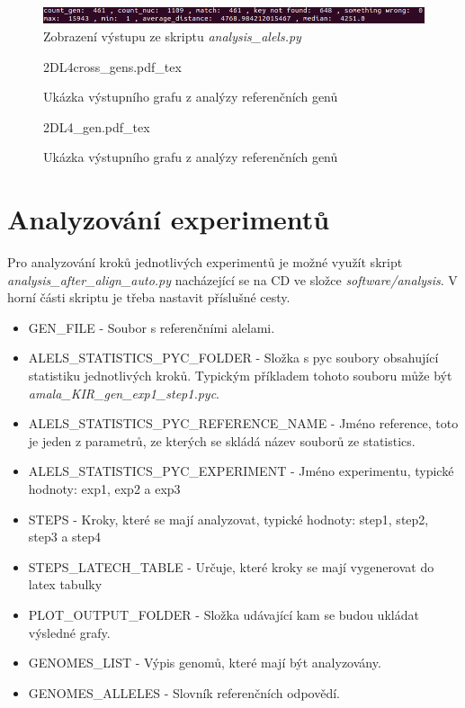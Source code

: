 \documentclass[czech,DP]{thesiskiv}
\numberwithin{equation}{section}
\begin{document}
\begin{figure}[H]		
		\centering
		\includegraphics[width=\textwidth]{./img/vystup_analyzy_refrence.png}
		\caption{Zobrazení výstupu ze skriptu \textit{analysis\_alels.py} }
		\label{fig:alels_distance_skript}
\end{figure}

\begin{figure}[H]
    \centering
    \def\svgwidth{\columnwidth}
    {2DL4cross_gens.pdf_tex} 
    \caption{Ukázka výstupního grafu z analýzy referenčních genů}
\end{figure}

\begin{figure}[H]
    \centering
    \def\svgwidth{\columnwidth}
    {2DL4_gen.pdf_tex} 
    \caption{Ukázka výstupního grafu z analýzy referenčních genů}
\end{figure}


\section{Analyzování experimentů}
Pro analyzování kroků jednotlivých experimentů je možné využít skript \textit{analysis\_after\_align\_auto.py} nacházející se na CD ve složce \textit{software/analysis}. V horní části skriptu je třeba nastavit příslušné cesty. 

\begin{itemize}
	\item GEN\_FILE - Soubor s referenčními alelami.
	\item ALELS\_STATISTICS\_PYC\_FOLDER - Složka s pyc soubory obsahující statistiku jednotlivých kroků. Typickým příkladem tohoto souboru může být \textit{amala\_KIR\_gen\_exp1\_step1.pyc}.
	\item ALELS\_STATISTICS\_PYC\_REFERENCE\_NAME - Jméno reference, toto je jeden z parametrů, ze kterých se skládá název souborů ze statistics.
	\item ALELS\_STATISTICS\_PYC\_EXPERIMENT - Jméno experimentu, typické hodnoty: exp1, exp2 a exp3
	\item STEPS - Kroky, které se mají analyzovat, typické hodnoty: step1, step2, step3 a step4
	\item STEPS\_LATECH\_TABLE  - Určuje, které kroky se mají vygenerovat do latex tabulky
	\item PLOT\_OUTPUT\_FOLDER - Složka udávající kam se budou ukládat výsledné grafy.
	\item GENOMES\_LIST - Výpis genomů, které mají být analyzovány.
	\item GENOMES\_ALLELES  - Slovník referenčních odpovědí.
\end{itemize}
\end{document}
